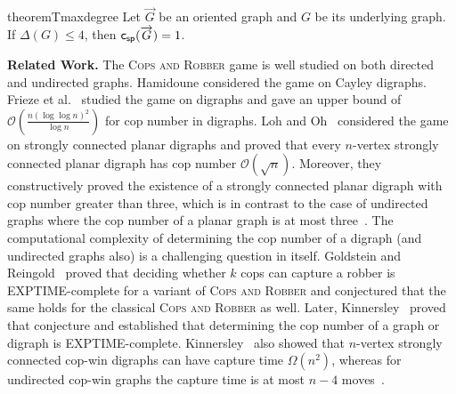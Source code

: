 \documentclass[a4paper,12pt]{amsart}
\newtheorem{theorem}{Theorem}[section]
\newcommand{\csp}[1]{{\sf c_{sp}}(\overrightarrow{#1})}
\newcommand{\CR}{\textsc{Cops and Robber}\xspace}
\let\leq\leqslant
\begin{document}
\begin{restatable}{theorem}{Tmaxdegree}\label{T:maxdegree}
    Let $\overrightarrow{G}$ be an oriented graph and $G$ be its underlying graph. If $\Delta(G) \leq 4$, then $\csp{G} = 1$.
\end{restatable}



\medskip
\noindent\textbf{Related Work.}
The \CR game is well studied on both directed and undirected graphs. Hamidoune \cite{hamidoune} considered the game on Cayley digraphs. 
Frieze et al.~\cite{lohjgt} studied the game on digraphs and gave an upper bound of $\mathcal{O}\left(\frac{n(\log \log n)^2}{\log n}\right)$ for cop number in digraphs. 
Loh and Oh~\cite{loh} considered the game on strongly connected planar digraphs and proved that every $n$-vertex strongly connected planar digraph has cop number $\mathcal{O}(\sqrt{n})$. Moreover, they constructively proved the existence of a strongly connected planar digraph with cop number greater than three, which is in contrast to the case of undirected graphs where the cop number of a planar graph is at most three~\cite{fromme1984game}. 
The computational complexity of determining the cop number of a digraph (and undirected graphs also) is a challenging question in itself. Goldstein and Reingold~\cite{exptime} proved that deciding whether $k$ cops can capture a robber is EXPTIME-complete for a variant of \CR and conjectured that the same holds for the classical \CR as well. 
Later, Kinnersley~\cite{kinnersley2015cops} proved that conjecture and established that determining the cop number of a graph or digraph is EXPTIME-complete. 
Kinnersley~\cite{kinnersley2018bounds} also showed that $n$-vertex strongly connected cop-win digraphs can have capture time $\Omega(n^2)$, whereas for undirected cop-win graphs the capture time is at most $n-4$ moves~\cite{gavenvciak2010cop}. 
\end{document}
